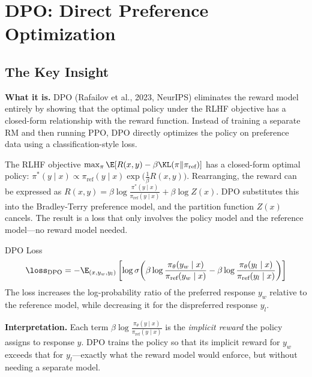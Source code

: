 \section{DPO: Direct Preference Optimization}
\label{sec:dpo}

\subsection{The Key Insight}

\textbf{What it is.} DPO (Rafailov et al., 2023, NeurIPS) eliminates the reward model entirely by showing that the optimal policy under the RLHF objective has a closed-form relationship with the reward function. Instead of training a separate RM and then running PPO, DPO directly optimizes the policy on preference data using a classification-style loss.

\begin{keyinsight}
The RLHF objective $\max_\pi \E[R(x,y) - \beta \KL(\pi \| \pi_{\text{ref}})]$ has a closed-form optimal policy: $\pi^*(y \mid x) \propto \pi_{\text{ref}}(y \mid x) \exp\!\big(\frac{1}{\beta}R(x,y)\big)$. Rearranging, the reward can be expressed as $R(x,y) = \beta \log \frac{\pi^*(y \mid x)}{\pi_{\text{ref}}(y \mid x)} + \beta \log Z(x)$. DPO substitutes this into the Bradley-Terry preference model, and the partition function $Z(x)$ cancels. The result is a loss that only involves the policy model and the reference model---no reward model needed.
\end{keyinsight}

\begin{mathresult}{DPO Loss}
\begin{equation}
\loss_{\text{DPO}} = -\E_{(x, y_w, y_l)}\left[\log \sigma\!\left(\beta \log \frac{\pi_\theta(y_w \mid x)}{\pi_{\text{ref}}(y_w \mid x)} - \beta \log \frac{\pi_\theta(y_l \mid x)}{\pi_{\text{ref}}(y_l \mid x)}\right)\right]
\end{equation}
The loss increases the log-probability ratio of the preferred response $y_w$ relative to the reference model, while decreasing it for the dispreferred response $y_l$.
\end{mathresult}

\textbf{Interpretation.} Each term $\beta \log \frac{\pi_\theta(y \mid x)}{\pi_{\text{ref}}(y \mid x)}$ is the \textit{implicit reward} the policy assigns to response $y$. DPO trains the policy so that its implicit reward for $y_w$ exceeds that for $y_l$---exactly what the reward model would enforce, but without needing a separate model.

